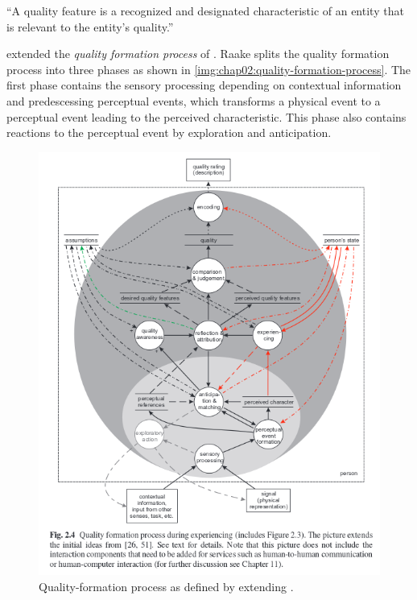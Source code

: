 \begin{definition}
``A quality feature is a recognized and designated characteristic of an entity that is relevant to the entity's quality.''~\cite[p. 17]{jekosch_voice_2005}
\end{definition}

\cite{raake_voip_2005, moller_quality_2014} extended the \emph{quality formation process} of \cite{jekosch_voice_2005}.
Raake splits the quality formation process into three phases as shown in \autoref{img:chap02:quality-formation-process}.
The first phase contains the sensory processing depending on contextual information and predescessing perceptual events, which transforms a physical event to a perceptual event leading to the perceived characteristic.
This phase also contains reactions to the perceptual event by exploration and anticipation.

\begin{figure}
	\includegraphics[width=1\textwidth]{fig/quality-formation-process}
	\caption{Quality-formation process as defined by \cite{moller_quality_2014} extending \cite{jekosch_voice_2005}.}
	\label{img:chap02:quality-formation-process}
\end{figure}

